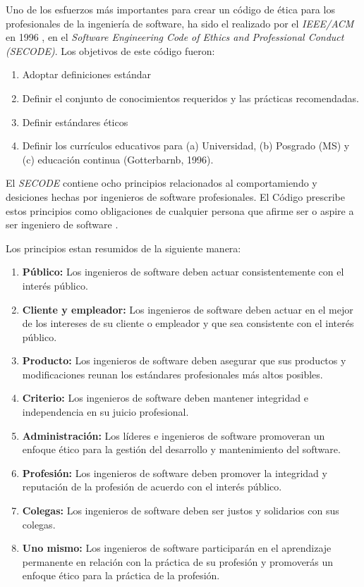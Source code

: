 \documentclass[twoside]{article}
\begin{document}
\begin{multicols}{2}
Uno de los esfuerzos más importantes para crear un código de ética para los
profesionales de la ingeniería de software, ha sido el realizado por el
\textit{IEEE/ACM} en 1996 \cite{gotterbarn2001software}, en el \textit{Software
Engineering Code of Ethics and Professional Conduct (SECODE)}. Los objetivos de este
código fueron:

\begin{enumerate}
    \item Adoptar definiciones estándar
    \item Definir el conjunto de conocimientos requeridos y las prácticas recomendadas.
    \item Definir estándares éticos
    \item Definir los currículos educativos para (a) Universidad, (b) Posgrado (MS) y (c)
educación continua (Gotterbarnb, 1996).
\end{enumerate}

El \textit{SECODE} contiene ocho principios relacionados al comportamiendo y
desiciones hechas por ingenieros de software profesionales. El Código prescribe
estos principios como obligaciones de cualquier persona que afirme ser o aspire
a ser ingeniero de software \cite{vallor2015introduction}.

Los principios estan resumidos de la siguiente manera:

\begin{enumerate}
\item \textbf{Público:} Los ingenieros de software deben actuar consistentemente
con el interés público.
\item \textbf{Cliente y empleador:} Los ingenieros de software deben actuar en
el mejor de los intereses de su cliente o empleador y que sea consistente con el
interés público.
\item \textbf{Producto:} Los ingenieros de software deben asegurar que sus
productos y modificaciones reunan los estándares profesionales más altos
posibles.
\item \textbf{Criterio:} Los ingenieros de software deben mantener integridad e
independencia en su juicio profesional.
\item \textbf{Administración:} Los líderes e ingenieros de software promoveran
un enfoque ético para la gestión del desarrollo y mantenimiento del software.
\item \textbf{Profesión:} Los ingenieros de software deben promover la
integridad y reputación de la profesión de acuerdo con el interés público.
\item \textbf{Colegas:} Los ingenieros de software deben ser justos y solidarios
con sus colegas.
\item \textbf{Uno mismo:} Los ingenieros de software participarán en el
aprendizaje permanente en relación con la práctica de su profesión y promoverás
un enfoque ético para la práctica de la profesión.
\end{enumerate}


\end{multicols}
\end{document}
